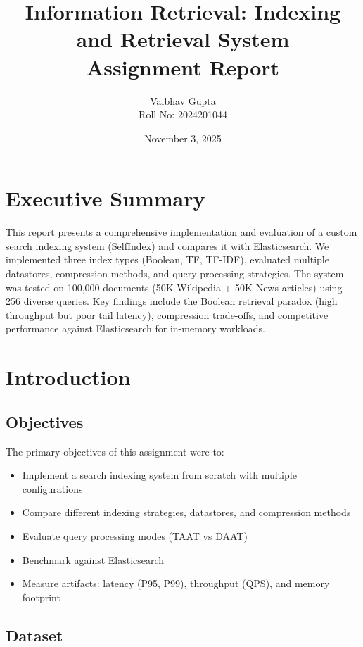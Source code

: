 \documentclass[12pt,a4paper]{article}
\title{\textbf{Information Retrieval: Indexing and Retrieval System}\\
\large Assignment Report}
\author{Vaibhav Gupta\\Roll No: 2024201044}
\date{November 3, 2025}
\begin{document}
\maketitle

\tableofcontents
\newpage

\section{Executive Summary}

This report presents a comprehensive implementation and evaluation of a custom search indexing system (SelfIndex) and compares it with Elasticsearch. We implemented three index types (Boolean, TF, TF-IDF), evaluated multiple datastores, compression methods, and query processing strategies. The system was tested on 100,000 documents (50K Wikipedia + 50K News articles) using 256 diverse queries. Key findings include the Boolean retrieval paradox (high throughput but poor tail latency), compression trade-offs, and competitive performance against Elasticsearch for in-memory workloads.

\section{Introduction}

\subsection{Objectives}

The primary objectives of this assignment were to:

\begin{itemize}
    \item Implement a search indexing system from scratch with multiple configurations
    \item Compare different indexing strategies, datastores, and compression methods
    \item Evaluate query processing modes (TAAT vs DAAT)
    \item Benchmark against Elasticsearch
    \item Measure artifacts: latency (P95, P99), throughput (QPS), and memory footprint
\end{itemize}

\subsection{Dataset}
\end{document}
